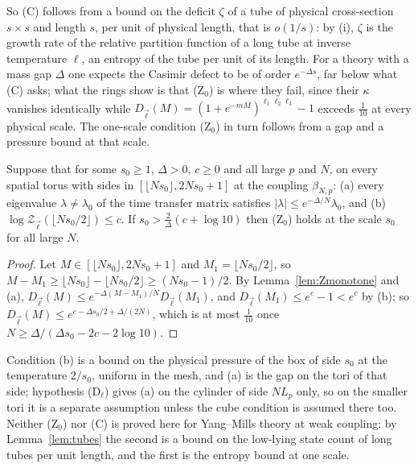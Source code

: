 So (C) follows from a bound on the deficit $\zeta$ of a tube of physical
cross-section $s\times s$ and length $s$, per unit of physical length, that
is $o(1/s)$: by (i), $\zeta$ is the growth rate of the relative partition
function of a long tube at inverse temperature $\ell$, an entropy of the
tube per unit of its length. For a theory with a mass gap $\Delta$ one
expects the Casimir defect to be of order $e^{-\Delta s}$, far below what
(C) asks; what the rings show is that (Z$_0$) is where they fail, since
their $\kappa$ vanishes identically while $D_{\vec\ell}(M)=(1+e^{-mM})^{
\ell_1\ell_2\ell_3}-1$ exceeds $\frac1{10}$ at every physical scale. The
one-scale condition (Z$_0$) in turn follows from a gap and a pressure bound
at that scale.

\begin{proposition}\label{prop:Zzero}
Suppose that for some $s_0\ge1$, $\Delta>0$, $c\ge0$ and all large $p$ and
$N$, on every spatial torus with sides in $[\lfloor Ns_0\rfloor,2Ns_0+1]$ at
the coupling $\beta_{N,p}$: \textup{(a)} every eigenvalue $\lambda\ne
\lambda_0$ of the time transfer matrix satisfies $|\lambda|\le e^{-\Delta/N}
\lambda_0$, and \textup{(b)} $\log\mathcal Z_{\vec\ell}(\lfloor Ns_0/2\rfloor)
\le c$. If $s_0>\frac2\Delta(c+\log10)$ then \textup{(Z$_0$)} holds at the
scale $s_0$ for all large $N$.
\end{proposition}

\begin{proof}
Let $M\in[\lfloor Ns_0\rfloor,2Ns_0+1]$ and $M_1=\lfloor Ns_0/2\rfloor$, so
$M-M_1\ge\lfloor Ns_0\rfloor-\lfloor Ns_0/2\rfloor\ge(Ns_0-1)/2$. By
Lemma~\ref{lem:Zmonotone} and (a), $D_{\vec\ell}(M)\le e^{-\Delta(M-M_1)/N}
D_{\vec\ell}(M_1)$, and $D_{\vec\ell}(M_1)\le e^{c}-1<e^c$ by (b); so
$D_{\vec\ell}(M)\le e^{c-\Delta s_0/2+\Delta/(2N)}$, which is at most
$\frac1{10}$ once $N\ge\Delta/(\Delta s_0-2c-2\log10)$.
\end{proof}

Condition (b) is a bound on the physical pressure of the box of side $s_0$
at the temperature $2/s_0$, uniform in the mesh, and (a) is the gap on the
tori of that side; hypothesis (D$_\ell$) gives (a) on the cylinder of side
$NL_p$ only, so on the smaller tori it is a separate assumption unless the
cube condition is assumed there too. Neither (Z$_0$) nor (C) is proved here
for Yang--Mills theory at weak coupling: by Lemma~\ref{lem:tubes} the second
is a bound on the low-lying state count of long tubes per unit length, and
the first is the entropy bound at one scale.

